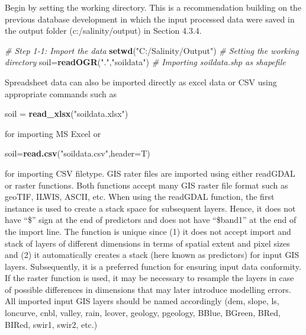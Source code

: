 \documentclass[
  10pt,
  b5paper,
]{book}
\newenvironment{Shaded}{\begin{snugshade}}{\end{snugshade}}
\newcommand{\CommentTok}[1]{\textcolor[rgb]{0.56,0.35,0.01}{\textit{#1}}}
\newcommand{\DataTypeTok}[1]{\textcolor[rgb]{0.13,0.29,0.53}{#1}}
\newcommand{\KeywordTok}[1]{\textcolor[rgb]{0.13,0.29,0.53}{\textbf{#1}}}
\newcommand{\NormalTok}[1]{#1}
\newcommand{\StringTok}[1]{\textcolor[rgb]{0.31,0.60,0.02}{#1}}
\begin{document}
Begin by setting the working directory. This is a recommendation building on the previous database development in which the input processed data were saved in the output folder (c:/salinity/output) in Section 4.3.4.

\begin{Shaded}
\begin{Highlighting}[]
\CommentTok{# Step 1-1: Import the data}
\KeywordTok{setwd}\NormalTok{(}\StringTok{"C:/Salinity/Output"}\NormalTok{) }\CommentTok{# Setting the working directory}
\NormalTok{soil=}\KeywordTok{readOGR}\NormalTok{(}\StringTok{"."}\NormalTok{,}\StringTok{"soildata"}\NormalTok{) }\CommentTok{# Importing soildata.shp as shapefile}
\end{Highlighting}
\end{Shaded}

Spreadsheet data can also be imported directly as excel data or CSV using appropriate commands such as

\begin{Shaded}
\begin{Highlighting}[]
\NormalTok{soil =}\StringTok{ }\KeywordTok{read_xlsx}\NormalTok{(}\StringTok{"soildata.xlsx"}\NormalTok{) }
\end{Highlighting}
\end{Shaded}

for importing MS Excel or

\begin{Shaded}
\begin{Highlighting}[]
\NormalTok{soil=}\KeywordTok{read.csv}\NormalTok{(}\StringTok{"soildata.csv"}\NormalTok{,}\DataTypeTok{header=}\NormalTok{T) }
\end{Highlighting}
\end{Shaded}

for importing CSV filetype. GIS rater files are imported using either readGDAL or raster functions. Both functions accept many GIS raster file format such as geoTIF, ILWIS, ASCII, etc. When using the readGDAL function, the first instance is used to create a stack space for subsequent layers. Hence, it does not have ``\$'' sign at the end of predictors and does not have ``\$band1'' at the end of the import line. The function is unique since (1) it does not accept import and stack of layers of different dimensions in terms of spatial extent and pixel sizes and (2) it automatically creates a stack (here known as predictors) for input GIS layers. Subsequently, it is a preferred function for ensuring input data conformity. If the raster function is used, it may be necessary to resample the layers in case of possible differences in dimensions that may later introduce modelling errors. All imported input GIS layers should be named accordingly (dem, slope, ls, loncurve, cnbl, valley, rain, lcover, geology, pgeology, BBlue, BGreen, BRed, BIRed, swir1, swir2, etc.)
\end{document}
